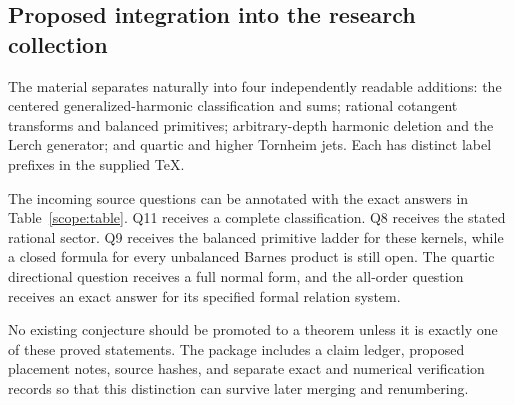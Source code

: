 \subsection{Proposed integration into the research collection}

The material separates naturally into four independently
readable additions: the centered generalized-harmonic
classification and sums; rational cotangent transforms and
balanced primitives; arbitrary-depth harmonic deletion and
the Lerch generator; and quartic and higher Tornheim jets.
Each has distinct label prefixes in the supplied TeX.

The incoming source questions can be annotated with the exact
answers in Table~\ref{scope:table}. Q11 receives a complete
classification. Q8 receives the stated rational sector.
Q9 receives the balanced primitive ladder for these kernels,
while a closed formula for every unbalanced Barnes product
is still open. The quartic directional question receives a
full normal form, and the all-order question receives an
exact answer for its specified formal relation system.

No existing conjecture should be promoted to a theorem
unless it is exactly one of these proved statements.
The package includes a claim ledger, proposed placement
notes, source hashes, and separate exact and numerical
verification records so that this distinction can survive
later merging and renumbering.
